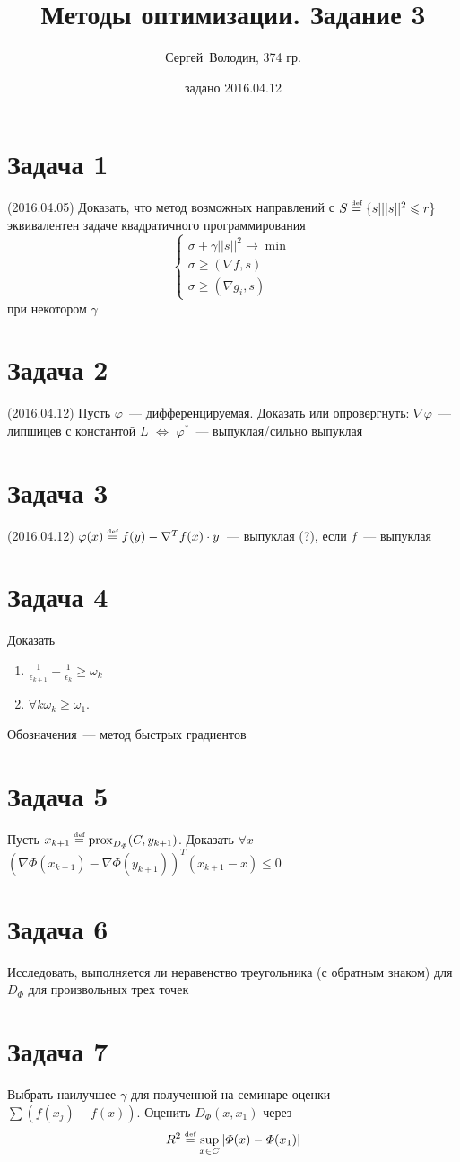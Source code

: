 \documentclass[a4paper]{article}
\title{Методы оптимизации. Задание 3}
\date{задано 2016.04.12}
\author{Сергей~Володин, 374 гр.}
\def\eqdef{\overset{\mbox{\tiny def}}{=}}
\begin{document}
\maketitle
\section*{Задача 1}
(2016.04.05)
Доказать, что метод возможных направлений с $S\eqdef \{s| ||s||^2\leqslant r\}$ эквивалентен задаче квадратичного программирования
$$\begin{cases}
\sigma+\gamma ||s||^2\to\min\\
\sigma\geqslant(\nabla f,s)\\
\sigma \geqslant (\nabla g_i,s)
\end{cases}$$
при некотором $\gamma$
\section*{Задача 2}
(2016.04.12)
Пусть $\varphi$~--- дифференцируемая. Доказать или опровергнуть:
$\nabla\varphi$~--- липшицев с константой $L$ $\Leftrightarrow$ $\varphi^*$~--- выпуклая/сильно выпуклая
\section*{Задача 3}
(2016.04.12)
$\varphi(x)\eqdef f(y)-\nabla^Tf(x)\cdot y$~--- выпуклая (?), если $f$~--- выпуклая
\section*{Задача 4}
Доказать\begin{enumerate}
\item $\frac{1}{\epsilon_{k+1}}-\frac{1}{\epsilon_{k}}\geqslant \omega_k$
\item $\forall k \omega_k\geqslant \omega_1$.
\end{enumerate}
Обозначения~--- метод быстрых градиентов
\section*{Задача 5}
Пусть $x_{k+1}\eqdef \mbox{prox}_{D_\varPhi}(C,y_{k+1})$. Доказать $\forall x$ $(\nabla\varPhi(x_{k+1})-\nabla\varPhi(y_{k+1}))^T(x_{k+1}-x)\leqslant 0$
\section*{Задача 6}
Исследовать, выполняется ли неравенство треугольника (с обратным знаком) для $D_{\varPhi}$ для произвольных трех точек
\section*{Задача 7}
Выбрать наилучшее $\gamma$ для полученной на семинаре оценки $\sum (f(x_j)-f(x))$. Оценить $D_{\varPhi}(x,x_1)$ через $$R^2\eqdef \sup_{x\in C}|\varPhi(x)-\varPhi(x_1)|$$
\end{document}
